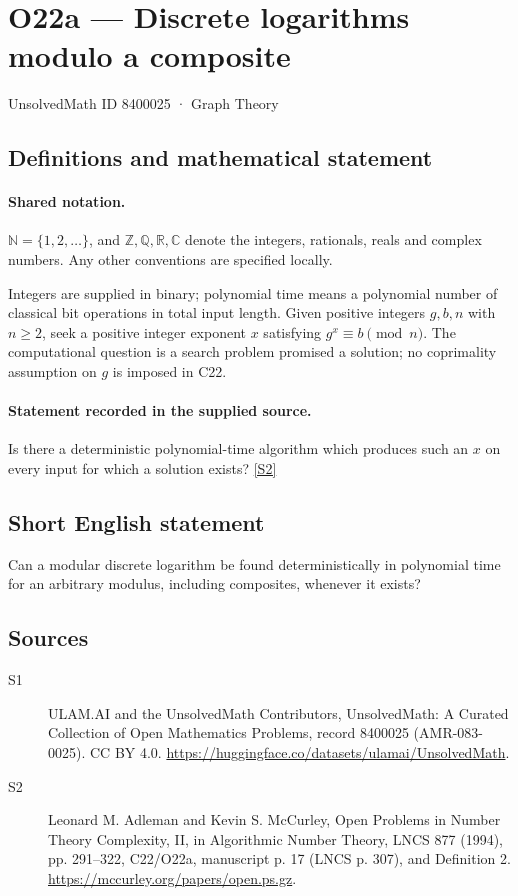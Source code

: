 \documentclass[11pt]{article}
\newcommand{\sref}[2]{\hyperlink{source:#1:#2}{[S#2]}}
\begin{document}
\setcounter{section}{8400024}
\section{O22a — Discrete logarithms modulo a composite}\label{8400025}
{\small\sffamily UnsolvedMath ID 8400025 · Graph Theory}
\subsection{Definitions and mathematical statement}

\paragraph{Shared notation.}$\mathbb N=\{1,2,\ldots\}$, and $\mathbb Z,\mathbb Q,\mathbb R,\mathbb C$ denote the integers, rationals, reals and complex numbers. Any other conventions are specified locally.


Integers are supplied in binary; polynomial time means a polynomial number of classical bit operations in total input length. Given positive integers $g,b,n$ with $n\ge2$, seek a positive integer exponent $x$ satisfying $g^x\equiv b\pmod n$. The computational question is a search problem promised a solution; no coprimality assumption on $g$ is imposed in C22.
\paragraph{Statement recorded in the supplied source.}
Is there a deterministic polynomial-time algorithm which produces such an $x$ on every input for which a solution exists? \sref{8400025}{2}
\subsection{Short English statement}
Can a modular discrete logarithm be found deterministically in polynomial time for an arbitrary modulus, including composites, whenever it exists?
\subsection{Sources}
\begin{description}
\item[\hypertarget{source:8400025:1}{S1}] ULAM.AI and the UnsolvedMath Contributors, UnsolvedMath: A Curated Collection of Open Mathematics Problems, record 8400025 (AMR-083-0025). CC BY 4.0. \url{https://huggingface.co/datasets/ulamai/UnsolvedMath}.
\item[\hypertarget{source:8400025:2}{S2}] Leonard M. Adleman and Kevin S. McCurley, Open Problems in Number Theory Complexity, II, in Algorithmic Number Theory, LNCS 877 (1994), pp. 291--322, C22/O22a, manuscript p. 17 (LNCS p. 307), and Definition 2. \url{https://mccurley.org/papers/open.ps.gz}.
\end{description}
\label{end:8400025}
\end{document}

